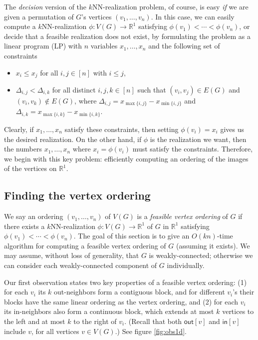 The \emph{decision} version of the $k$NN-realization problem, of course, is easy \emph{if} we are given a permutation of $G$'s vertices $(v_1,\dots,v_n)$. In this case, we can easily compute a $k$NN-realization $\phi: V(G) \rightarrow \mathbb{R}^1$ satisfying $\phi(v_1) < \cdots < \phi(v_n)$, or decide that a feasible realization does not exist, by formulating the  problem as a linear program (LP) with $n$ variables $x_1,\dots,x_n$ and the following set of constraints
\begin{itemize}
    \item $x_i \leq x_j$ for all $i,j \in [n]$ with $i \leq j$,
    \item $\Delta_{i,j} < \Delta_{i,k}$ for all distinct $i,j,k \in [n]$ such that $(v_i,v_j) \in E(G)$ and $(v_i,v_k) \notin E(G)$, where $\Delta_{i,j} = x_{\max\{i,j\}} - x_{\min\{i,j\}}$ and $\Delta_{i,k} = x_{\max\{i,k\}} - x_{\min\{i,k\}}$.
\end{itemize}
%
Clearly, if $x_1,\dots,x_n$ satisfy these constraints, then setting $\phi(v_i) = x_i$ gives us the desired realization.
On the other hand, if $\phi$ is the realization we want, then the numbers $x_1,\dots,x_n$ where $x_i = \phi(v_i)$ must satisfy the constraints.
Therefore, we begin with this key problem: efficiently computing an ordering of the images of the vertices on $\mathbb{R}^1$.

\subsection{Finding the vertex ordering}

We say an ordering $(v_1,\dots,v_n)$ of $V(G)$ is a \textit{feasible vertex ordering} of $G$ if there exists a $k$NN-realization $\phi: V(G) \rightarrow \mathbb{R}^1$ of $G$ in $\mathbb{R}^1$ satisfying $\phi(v_1) < \cdots < \phi(v_n)$.
The goal of this section is to give an $O(kn)$-time algorithm for computing a feasible vertex ordering of $G$ (assuming it exists).
We may assume, without loss of generality, that $G$ is weakly-connected; otherwise we can consider each weakly-connected component of $G$ individually. 

Our first observation states two key properties of a feasible vertex ordering: (1) for each $v_i$ its $k$ out-neighbors form a contiguous block, and for different $v_i$'s their blocks have the same linear ordering as the vertex ordering, and (2) for each $v_i$ its in-neighbors also form a continuous block, which extends at most $k$ vertices to the left and at most $k$ to the right of $v_i$. (Recall that both $\mathsf{out}[v]$ and $\mathsf{in}[v]$ include $v$, for all vertices $v \in V(G)$.) See figure \ref{fig:obs1d}.

